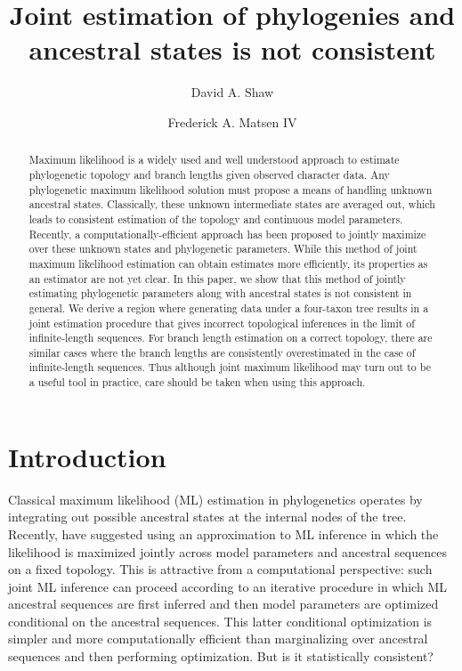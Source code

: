 \documentclass{article}
\title{Joint estimation of phylogenies and ancestral states is not consistent}
\author{David A. Shaw \and Frederick A. Matsen IV}
\begin{document}
\maketitle

\renewcommand{\arraystretch}{1.2} %

\begin{abstract}
Maximum likelihood is a widely used and well understood approach to estimate phylogenetic topology and branch lengths given observed character data.
Any phylogenetic maximum likelihood solution must propose a means of handling unknown ancestral states.
Classically, these unknown intermediate states are averaged out, which leads to consistent estimation of the topology and continuous model parameters.
Recently, a computationally-efficient approach has been proposed to jointly maximize over these unknown states and phylogenetic parameters.
While this method of joint maximum likelihood estimation can obtain estimates more efficiently, its properties as an estimator are not yet clear.
In this paper, we show that this method of jointly estimating phylogenetic parameters along with ancestral states is not consistent in general.
We derive a region where generating data under a four-taxon tree results in a joint estimation procedure that gives incorrect topological inferences in the limit of infinite-length sequences.
For branch length estimation on a correct topology, there are similar cases where the branch lengths are consistently overestimated in the case of infinite-length sequences.
Thus although joint maximum likelihood may turn out to be a useful tool in practice, care should be taken when using this approach.
\end{abstract}

\section*{Introduction}

Classical maximum likelihood (ML) estimation in phylogenetics operates by integrating out possible ancestral states at the internal nodes of the tree.
Recently, \cite{Sagulenko2017-jo} have suggested using an approximation to ML inference in which the likelihood is maximized jointly across model parameters and ancestral sequences on a fixed topology.
This is attractive from a computational perspective: such joint ML inference can proceed according to an iterative procedure in which ML ancestral sequences are first inferred and then model parameters are optimized conditional on the ancestral sequences.
This latter conditional optimization is simpler and more computationally efficient than marginalizing over ancestral sequences and then performing optimization.
But is it statistically consistent?
\end{document}
